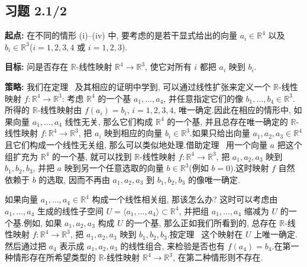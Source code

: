 \subsection*{习题 2.1/2}

\noindent\textbf{起点:} 在不同的情形 (i)--(iv) 中, 要考虑的是若干显式给出的向量 $a_i \in \mathbb{R}^4$ 以及 $b_i \in \mathbb{R}^3$($i = 1, 2, 3, 4$ 或 $i = 1, 2, 3$).

\noindent\textbf{目标:} 问是否存在 $\mathbb{R}$-线性映射 $\mathbb{R}^4 \longrightarrow \mathbb{R}^3$, 使它对所有 $i$ 都把 $a_i$ 映到 $b_i$.

\noindent\textbf{策略:} 我们在定理~ 及其相应的证明中学到, 可以通过线性扩张来定义一个 $\mathbb{R}$-线性映射 $f \colon \mathbb{R}^4 \longrightarrow \mathbb{R}^3$: 考虑 $\mathbb{R}^4$ 的一个基 $a_1, \ldots, a_4$, 并任意指定它们的像 $b_1, \ldots, b_4 \in \mathbb{R}^3$.所得的 $\mathbb{R}$-线性映射由 $f(a_i) = b_i$, $i = 1, 2, 3, 4$, 唯一确定.因此在相应的情形中, 如果向量 $a_1, \ldots, a_4$ 线性无关, 那么它们构成 $\mathbb{R}^4$ 的一个基, 并且总存在唯一确定的 $\mathbb{R}$-线性映射 $f \colon \mathbb{R}^4 \longrightarrow \mathbb{R}^3$, 把 $a_i$ 映到相应的向量 $b_i \in \mathbb{R}^3$.如果只给出向量 $a_1, a_2, a_3 \in \mathbb{R}^4$ 且它们构成一个线性无关组, 那么可以类似地处理.借助定理~ 用一个向量 $a$ 把这个组扩充为 $\mathbb{R}^4$ 的一个基, 就可以找到 $\mathbb{R}$-线性映射 $f \colon \mathbb{R}^4 \longrightarrow \mathbb{R}^3$, 把 $a_1, a_2, a_3$ 映到 $b_1, b_2, b_3$, 并把 $a$ 映到另一个任意选取的向量 $b \in \mathbb{R}^3$(例如 $b = 0$).这时映射 $f$ 自然依赖于 $b$ 的选取, 因而不再由 $a_1, a_2, a_3$ 到 $b_1, b_2, b_3$ 的像唯一确定.

如果向量 $a_1, \ldots, a_4 \in \mathbb{R}^4$ 构成一个线性相关组, 那该怎么办? 这时可以考虑由 $a_1, \ldots, a_4$ 生成的线性子空间 $U = \langle a_1, \ldots, a_4 \rangle \subset \mathbb{R}^4$, 并把组 $a_1, \ldots, a_4$ 缩减为 $U$ 的一个基.例如, 如果 $a_1, a_2, a_3$ 构成 $U$ 的一个基, 那么正如我们所看到的, 总存在 $\mathbb{R}$-线性映射 $f \colon \mathbb{R}^4 \longrightarrow \mathbb{R}^3$, 把 $a_1, a_2, a_3$ 映到 $b_1, b_2, b_3$.按定理~ 这个映射在 $U$ 上唯一确定.然后通过把 $a_4$ 表示成 $a_1, a_2, a_3$ 的线性组合, 来检验是否也有 $f(a_4) = b_4$.在第一种情形存在所希望类型的 $\mathbb{R}$-线性映射 $\mathbb{R}^4 \longrightarrow \mathbb{R}^3$, 在第二种情形则不存在.

